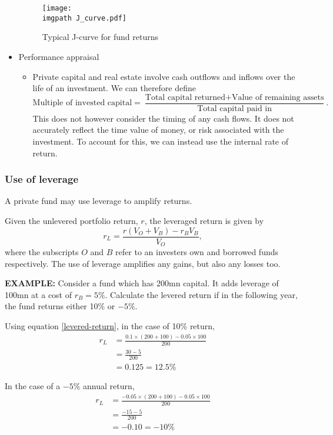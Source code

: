 \documentclass[../notes_compiled.tex]{subfiles}
\begin{document}
\begin{itemize}
\begin{figure}[h]
  \centering
  \texttt{[image: \\imgpath J\_curve.pdf]}
  \caption{Typical J-curve for fund returns}
\end{figure}
\vspace{-.2cm}
\item Performance appraisal
\begin{itemize}
\item Private capital and real estate involve cash outflows and inflows over the life of an investment. We can therefore define
{\small
\begin{equation}
\text{Multiple of invested capital} = \frac{\text{Total capital returned}+\text{Value of remaining assets}}{\text{Total capital paid in}}.
\end{equation}
}
This does not however consider the timing of any cash flows. It does not accurately reflect the time value of money, or risk associated with the investment. To account for this, we can instead use the internal rate of return.
\end{itemize}
\end{itemize}

\subsubsection{Use of leverage}
\begin{itemize}
\item A private fund may use leverage to amplify returns.
\item Given the unlevered portfolio return, $r$, the leveraged return is given by
\begin{equation}
r_{L} = \frac{r(V_{O} + V_{B})-r_{B}V_{B}}{V_{O}}, \label{levered-return}
\end{equation}
where the subscripts $O$ and $B$ refer to an investers own and borrowed funds respectively. The use of leverage amplifies any gains, but also any losses too.
{\color{RedViolet}
\item[] \textbf{EXAMPLE:} Consider a fund which has 200mn capital. It adds leverage of 100mn at a cost of $r_{B}=5\%$. Calculate the levered return if in the following year, the fund returns either 10\% or $-5\%$.
}
{\color{RoyalBlue}
\item[] Using equation \ref{levered-return}, in the case of 10\% return,
\begin{align*}
r_{L} &= \frac{0.1\times(200 + 100) - 0.05 \times 100}{200} \\
&=\frac{30 -5}{200} \\
&=0.125=12.5\%
\end{align*}
\item[] In the case of a $-5\%$ annual return,
\begin{align*}
r_{L} &= \frac{-0.05\times(200 + 100) - 0.05 \times 100}{200} \\
&=\frac{-15-5}{200} \\
&= -0.10 = -10\%
\end{align*}
}
\end{itemize}
\end{document}
